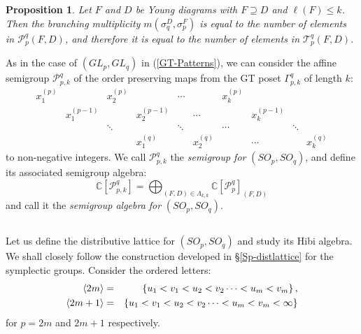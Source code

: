 \documentclass[11pt]{amsart}
\numberwithin{equation}{subsection}
\newtheorem{proposition}[theorem]{Proposition}
\begin{document}
\begin{proposition}\label{SO-counting}
Let $F$ and $D$ be Young diagrams with $F\supseteq D$ and $\ell (F)\leq k$.
Then the branching multiplicity $m(\sigma _{q}^{D},\sigma _{p}^{F})$ is
equal to the number of elements in $\mathcal{P}_{p}^{q}(F,D)$, and therefore
it is equal to the number of elements in $\mathcal{T}_{p}^{q}(F,D)$.
\end{proposition}


\smallskip

As in the case of $({GL}_{p},{GL}_{q})$ in (\ref{GT-Patterns}), we can
consider the affine semigroup $\mathcal{P}_{p,k}^{q}$ of the order
preserving maps from the GT poset $\Gamma _{p,k}^{q}$ of length $k$:
\begin{equation*}
\begin{array}{cccccccccc}
x_{1}^{(p)} &  & x_{2}^{(p)} &  & \cdots &  & x_{k}^{(p)} &  &  &  \\ 
& x_{1}^{(p-1)} &  & x_{2}^{(p-1)} &  & \cdots &  & x_{k}^{(p-1)} &  &  \\ 
&  & \ddots &  & \ddots &  & \cdots &  & \ddots &  \\ 
&  &  & x_{1}^{(q)} &  & x_{2}^{(q)} &  & \cdots &  & x_{k}^{(q)}\end{array}\end{equation*}
to non-negative integers. We call $\mathcal{P}_{p,k}^{q}$ the 
\textit{semigroup for} $({SO}_{p},{SO}_{q})$, and define its associated semigroup
algebra:
\begin{equation*}
\mathbb{C}[\mathcal{P}_{p,k}^{q}]=\bigoplus_{(F,D)\in \Lambda _{k,k}}
\mathbb{C}[\mathcal{P}_{p}^{q}]_{(F,D)} 
\end{equation*}
and call it the \textit{semigroup algebra for} $({SO}_{p},{SO}_{q})$.

\medskip

\subsection{}\label{SO-distlattice}

Let us define the distributive lattice for $({SO}_{p},{SO}_{q})$ and
study its Hibi algebra. We shall closely follow the construction developed in
\S \ref{Sp-distlattice} for the symplectic groups. Consider the ordered letters:
\begin{eqnarray}\label{O-alphabet}
\langle 2m \rangle &=& \left\{ u_1 < v_1 < u_2 < v_2 \cdots < u_m < v_m  \right\}, \\
\langle 2m+1 \rangle &=& \left\{ u_1 < v_1 < u_2 < v_2 \cdots < u_m < v_m  < \infty \right\} \notag
\end{eqnarray}
for $p=2m$ and $2m+1$ respectively.
\end{document}

